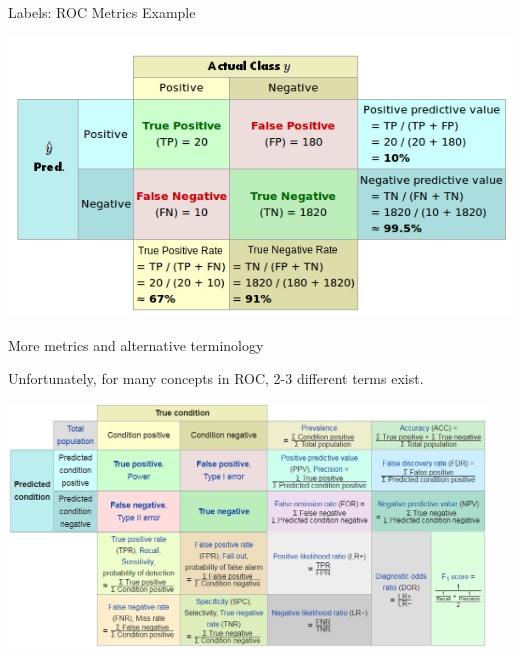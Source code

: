 \documentclass[11pt,compress,t,notes=noshow, xcolor=table]{beamer}
\begin{document}
\begin{vbframe}{Labels: ROC Metrics}
Example
\begin{center}
  \includegraphics[width=\textwidth]{figure_man/roc-confmatrix-example.png}
\end{center}

\end{vbframe}

\begin{vbframe}{More metrics and alternative terminology}

Unfortunately, for many concepts in ROC, 2-3 different terms exist.

\begin{center}
\includegraphics[width=0.95\textwidth]{figure_man/roc-confmatrix-allterms.png}
\end{center}
\href{https://en.wikipedia.org/wiki/F1_score#Diagnostic_testing}{} $\phantom{blablabla}$
\href{https://upload.wikimedia.org/wikipedia/commons/0/0e/DiagnosticTesting_Diagram.svg}{}
\end{vbframe}
\end{document}
